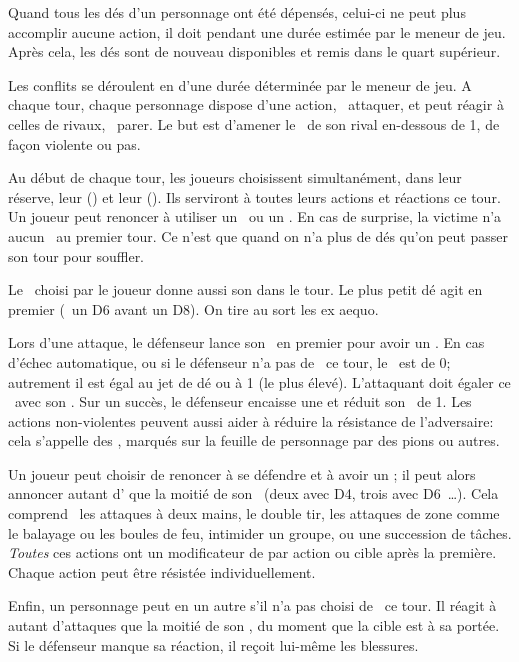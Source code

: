 {		Quand tous les dés d'un personnage ont été dépensés, celui-ci ne peut plus accomplir aucune action, il doit  pendant une durée estimée par le meneur de jeu. Après cela, les dés sont de nouveau disponibles et remis dans le quart supérieur.


		\noindent
		Les conflits se déroulent en  d'une durée déterminée par le meneur de jeu. A chaque tour, chaque personnage dispose d'une action, \pe\ attaquer, et peut réagir à celles de rivaux, \pe\ parer. Le but est d'amener le \HD\ de son rival en-dessous de 1, de façon violente ou pas.

		Au début de chaque tour, les joueurs choisissent simultanément, dans leur réserve, leur  (\AD) et leur  (\RD). Ils serviront à toutes leurs actions et réactions ce tour. Un joueur peut renoncer à utiliser un \AD\ ou un \RD. En cas de surprise, la victime n'a aucun \AD\ au premier tour. Ce n'est que quand on n'a plus de dés qu'on peut passer son tour pour souffler.

		Le \AD\ choisi par le joueur donne aussi son  dans le tour. Le plus petit dé agit en premier (\pe\ un D6 avant un D8). On tire au sort les ex aequo.

		Lors d'une attaque, le défenseur lance son \RD\ en premier pour avoir un \TN. En cas d'échec automatique, ou si le défenseur n'a pas de \RD\ ce tour, le \TN\ est de 0; autrement il est égal au jet de dé ou à 1 (le plus élevé). L'attaquant doit égaler ce \TN\ avec son \AD. Sur un succès, le défenseur encaisse une  et réduit son \HD\ de 1. Les actions non-violentes peuvent aussi aider à réduire la résistance de l'adversaire: cela s'appelle des , marqués sur la feuille de personnage par des pions ou autres.

		Un joueur peut choisir de renoncer à se défendre et à avoir un \RD; il peut alors annoncer autant d' que la moitié de son \AD\ (deux avec D4, trois avec D6~\ldots). Cela comprend \pe\ les attaques à deux mains, le double tir, les attaques de zone comme le balayage ou les boules de feu, intimider un groupe, ou une succession de tâches. \emph{Toutes} ces actions ont un modificateur de  par action ou cible après la première. Chaque action peut être résistée individuellement.

		Enfin, un personnage peut en  un autre s'il n'a pas choisi de \AD\ ce tour. Il réagit à autant d'attaques que la moitié de son \RD, du moment que la cible est à sa portée. Si le défenseur manque sa réaction, il reçoit lui-même les blessures.

}
